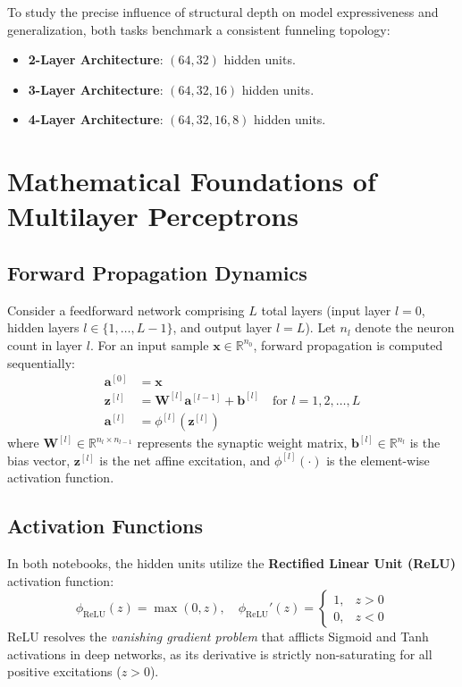 \documentclass[12pt]{article}
\begin{document}
To study the precise influence of structural depth on model expressiveness and generalization, both tasks benchmark a consistent funneling topology:
\begin{itemize}
    \item \textbf{2-Layer Architecture}: $(64, 32)$ hidden units.
    \item \textbf{3-Layer Architecture}: $(64, 32, 16)$ hidden units.
    \item \textbf{4-Layer Architecture}: $(64, 32, 16, 8)$ hidden units.
\end{itemize}

\section{Mathematical Foundations of Multilayer Perceptrons}

\subsection{Forward Propagation Dynamics}
Consider a feedforward network comprising $L$ total layers (input layer $l=0$, hidden layers $l \in \{1, \dots, L-1\}$, and output layer $l=L$). Let $n_l$ denote the neuron count in layer $l$. For an input sample $\mathbf{x} \in \mathbb{R}^{n_0}$, forward propagation is computed sequentially:
\begin{align}
    \mathbf{a}^{[0]} &= \mathbf{x} \\
    \mathbf{z}^{[l]} &= \mathbf{W}^{[l]} \mathbf{a}^{[l-1]} + \mathbf{b}^{[l]} \quad \text{for } l = 1, 2, \dots, L \\
    \mathbf{a}^{[l]} &= \phi^{[l]}(\mathbf{z}^{[l]})
\end{align}
where $\mathbf{W}^{[l]} \in \mathbb{R}^{n_l \times n_{l-1}}$ represents the synaptic weight matrix, $\mathbf{b}^{[l]} \in \mathbb{R}^{n_l}$ is the bias vector, $\mathbf{z}^{[l]}$ is the net affine excitation, and $\phi^{[l]}(\cdot)$ is the element-wise activation function.

\subsection{Activation Functions}
In both notebooks, the hidden units utilize the \textbf{Rectified Linear Unit (ReLU)} activation function:
\begin{equation}
    \phi_{\text{ReLU}}(z) = \max(0, z), \quad \phi_{\text{ReLU}}'(z) = \begin{cases} 1, & z > 0 \\ 0, & z < 0 \end{cases}
\end{equation}
ReLU resolves the \textit{vanishing gradient problem} that afflicts Sigmoid and Tanh activations in deep networks, as its derivative is strictly non-saturating for all positive excitations ($z > 0$).
\end{document}

